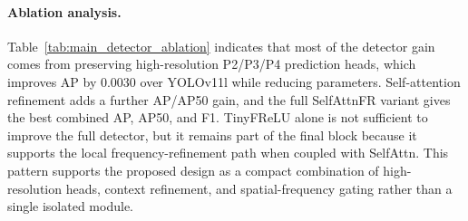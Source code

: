 \begin{table}[t]
\centering
\scriptsize
\setlength{\tabcolsep}{3pt}
\caption{Final detector ablation under the normalized VisDrone2019-DET
1280-pixel protocol. Deltas are relative to YOLOv11l. AP and AP50 are reported
as mean $\pm$ standard deviation over seeds 42, 123, and 2026 when available.}
\label{tab:main_detector_ablation}

\end{table}

\paragraph{Ablation analysis.}
Table~\ref{tab:main_detector_ablation} indicates that most of the detector gain
comes from preserving high-resolution P2/P3/P4 prediction heads, which improves
AP by 0.0030 over YOLOv11l while reducing parameters. Self-attention refinement
adds a further AP/AP50 gain, and the full SelfAttnFR variant gives the best
combined AP, AP50, and F1. TinyFReLU alone is not sufficient to improve the
full detector, but it remains part of the final block because it supports the
local frequency-refinement path when coupled with SelfAttn. This pattern
supports the proposed design as a compact combination of high-resolution heads,
context refinement, and spatial-frequency gating rather than a single isolated
module.
